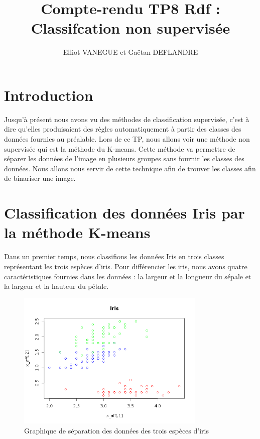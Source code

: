 \documentclass[a4paper,11pt]{article}
\title{Compte-rendu TP8 Rdf : Classifcation non supervisée}
\author{Elliot VANEGUE et Gaëtan DEFLANDRE}
\begin{document}
  
  
  
  \maketitle
  
  \mbox{}
  \newpage
  \clearpage
  
  \section*{Introduction}
    Jusqu'à présent nous avons vu des méthodes de classification supervisée, c'est à dire qu'elles produisaient
    des règles automatiquement à partir des classes des données fournies au préalable. 
    Lors de ce TP, nous allons voir une méthode non supervisée qui est la méthode du K-means. Cette méthode
    va permettre de séparer les données de l'image en plusieurs groupes sans fournir les classes des données. Nous allons
    nous servir de cette technique afin de trouver les classes afin de binariser une image.\\
  
  \section{Classification des données Iris par la méthode K-means}
  Dans un premier temps, nous classifions les données Iris en trois classes représentant les trois espèces
  d'iris. Pour différencier les iris, nous avons quatre caractéristiques fournies dans les données : la largeur et
  la longueur du sépale et la largeur et la hauteur du pétale.\\
  
  \begin{figure}[H]
    \center
    \includegraphics[width=9cm]{resultat/separation_espece.png}
    \caption{Graphique de séparation des données des trois espèces d'iris}
  \end{figure}
  
\end{document}
